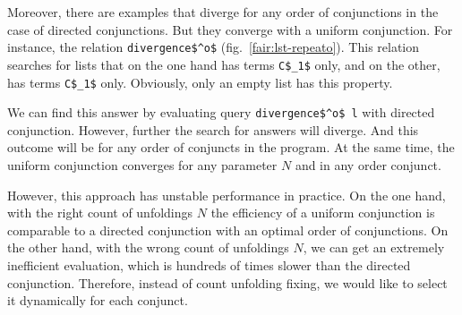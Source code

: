 Moreover, there are examples that diverge for any order of conjunctions in the case of directed conjunctions. But they converge with a uniform conjunction.  For instance, the relation \lstinline{divergence$^o$} (fig.~\ref{fair:lst-repeato}). This relation searches for lists that on the one hand has terms \lstinline{C$_1$} only, and on the other, has terms \lstinline{C$_1$} only. Obviously, only an empty list has this property.

We can find this answer by evaluating query \lstinline{divergence$^o$ l} with directed conjunction. However, further the search for answers will diverge. And this outcome will be for any order of conjuncts in the program. At the same time, the uniform conjunction converges for any parameter $N$ and in any order conjunct.

However, this approach has unstable performance in practice. On the one hand, with the right count of unfoldings $N$ the efficiency of a uniform conjunction is comparable to a directed conjunction with an optimal order of conjunctions. On the other hand, with the wrong count of unfoldings $N$, we can get an extremely inefficient evaluation, which is hundreds of times slower than the directed conjunction. Therefore, instead of count unfolding fixing, we would like to select it dynamically for each conjunct.

